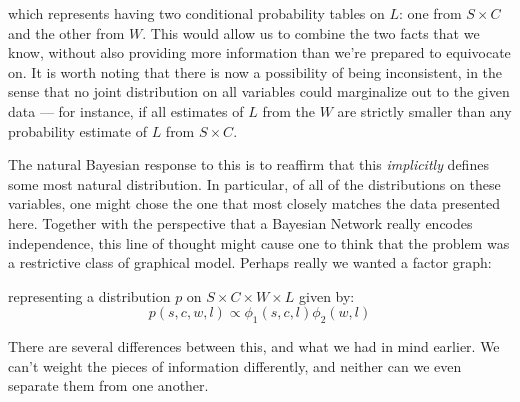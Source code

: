 \documentclass{article}
\begin{document}
\begin{example}
		which represents having two conditional probability tables on $L$: one from $S \times C$ and the other from $W$. This would allow us to combine the two facts that we know, without also providing more information than we're prepared to equivocate on. It is worth noting that there is now a possibility of being inconsistent, in the sense that no joint distribution on all variables could marginalize out to the given data --- for instance, if all estimates of $L$ from the $W$ are strictly smaller than any probability estimate of $L$ from $S \times C$.
		
		
		The natural Bayesian response to this is to reaffirm that this \textit{implicitly} defines some most natural distribution. In particular, of all of the distributions on these variables, one might chose the one that most closely matches the data presented here.
		Together with the perspective that a Bayesian Network really encodes independence, this line of thought might cause one to think that the problem was a restrictive class of graphical model. Perhaps really we wanted a factor graph:
		
		\begin{center}
		\end{center}
		representing a distribution $p$ on $S \times C \times W \times L$ given by:
		\[ p(s, c, w, l) \propto \phi_1(s,c,l) \phi_2(w,l) \]
		
		There are several differences between this, and what we had in mind earlier. We can't weight the pieces of information differently, and neither can we even separate them from one another.
		
		
		
	\end{example}
\end{document}
